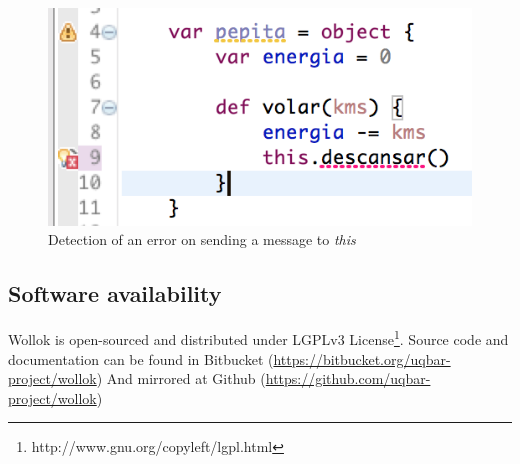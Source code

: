 \begin{figure}[ht]
    \centering
	\includegraphics[scale=0.5]{images/wollok-paper-check-noMethodOnThis.png}
    \caption{Detection of an error on sending a message to \emph{this}}
    \label{fig:check-noMethodOnThis.png}
\end{figure}

\subsection{Software availability}

Wollok is open-sourced and distributed under LGPLv3 License\footnote{http://www.gnu.org/copyleft/lgpl.html}.
Source code and documentation can be found in Bitbucket (\url{https://bitbucket.org/uqbar-project/wollok}) 
And mirrored at Github (\url{https://github.com/uqbar-project/wollok})
